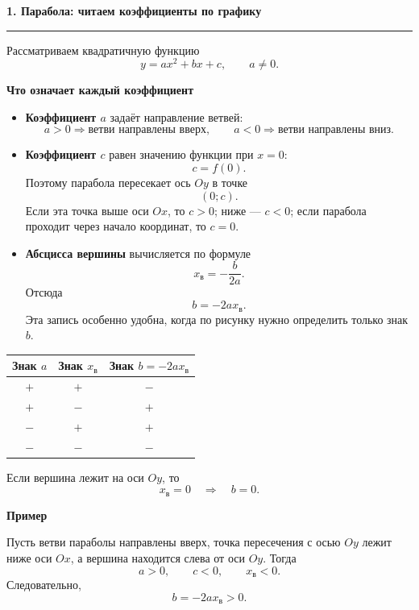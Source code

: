 \documentclass[a4paper,12pt]{article}
\newcommand{\topic}[1]{%
  \vspace{0.25em}
  {\Large\bfseries\color{darkaccent}#1}\par
  \vspace{0.1em}
  {\color{accent}\rule{\linewidth}{0.7pt}}\par
  \vspace{0.35em}
}
\newcommand{\subtopic}[1]{%
  \vspace{0.35em}
  {\large\bfseries\color{darkaccent}#1}\par
  \vspace{0.1em}
}
\newcommand{\key}[1]{\textbf{\color{darkaccent}#1}}
\begin{document}
\topic{1. Парабола: читаем коэффициенты по графику}

Рассматриваем квадратичную функцию
\[
  y=ax^2+bx+c,
  \qquad a\ne0.
\]

\subtopic{Что означает каждый коэффициент}

\begin{itemize}
  \item
  \key{Коэффициент $a$} задаёт направление ветвей:
  \[
    a>0 \Rightarrow \text{ветви направлены вверх},
    \qquad
    a<0 \Rightarrow \text{ветви направлены вниз}.
  \]

  \item
  \key{Коэффициент $c$} равен значению функции при $x=0$:
  \[
    c=f(0).
  \]
  Поэтому парабола пересекает ось $Oy$ в точке
  \[
    (0;c).
  \]
  Если эта точка выше оси $Ox$, то $c>0$; ниже --- $c<0$;
  если парабола проходит через начало координат, то $c=0$.

  \item
  \key{Абсцисса вершины} вычисляется по формуле
  \[
    x_{\text{в}}=-\frac{b}{2a}.
  \]
  Отсюда
  \[
    b=-2ax_{\text{в}}.
  \]
  Эта запись особенно удобна, когда по рисунку нужно определить только знак $b$.
\end{itemize}

\begin{center}
\begin{tabular}{ccc}
\toprule
Знак $a$ & Знак $x_{\text{в}}$ & Знак $b=-2ax_{\text{в}}$ \\
\midrule
$+$ & $+$ & $-$ \\
$+$ & $-$ & $+$ \\
$-$ & $+$ & $+$ \\
$-$ & $-$ & $-$ \\
\bottomrule
\end{tabular}
\end{center}

Если вершина лежит на оси $Oy$, то
\[
  x_{\text{в}}=0
  \quad\Rightarrow\quad
  b=0.
\]

\subtopic{Пример}

Пусть ветви параболы направлены вверх, точка пересечения с осью $Oy$
лежит ниже оси $Ox$, а вершина находится слева от оси $Oy$.
Тогда
\[
  a>0,
  \qquad
  c<0,
  \qquad
  x_{\text{в}}<0.
\]
Следовательно,
\[
  b=-2ax_{\text{в}}>0.
\]
\end{document}
